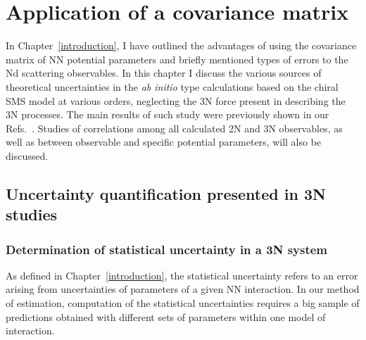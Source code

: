 \chapter{Application of a covariance matrix}
\label{application_cov_mat}
In Chapter~\ref{introduction}, I have outlined the advantages of using the covariance matrix of NN potential parameters and briefly mentioned types of errors to the Nd scattering observables. In this chapter I discuss the various sources of theoretical uncertainties in the \textit{ab initio} type calculations based on the chiral SMS model at various orders, neglecting the 3N force present in describing the 3N processes. The main results of such study were previously shown in our Refs.~\cite{Skibinski2018, volkotrub2020uncertainty}. Studies of correlations among all calculated 2N and 3N observables, as well as between observable and specific potential parameters, will also be discussed.

\section{Uncertainty quantification presented in 3N studies}
\label{uq}

\subsection{Determination of statistical uncertainty in a 3N system}
\label{statistical}
As defined in Chapter~\ref{introduction}, the statistical uncertainty refers to an error arising from uncertainties of parameters of a given NN interaction. In our method of estimation, computation of the statistical uncertainties requires a big sample of predictions obtained with different sets of parameters within one model of interaction. 

